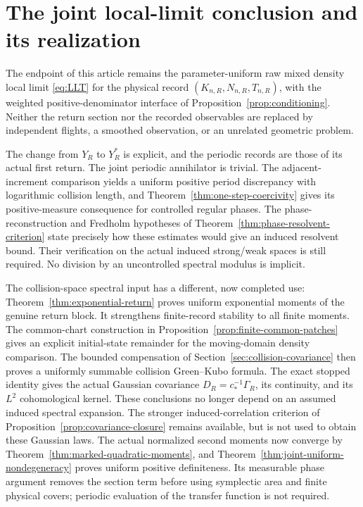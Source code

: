 \section{The joint local-limit conclusion and its realization}
\label{sec:final-realization}
The endpoint of this article remains the parameter-uniform raw mixed
density local limit \eqref{eq:LLT} for the physical record
$(K_{n,R},N_{n,R},T_{n,R})$, with the weighted positive-denominator
interface of Proposition~\ref{prop:conditioning}. Neither the return
section nor the recorded observables are replaced by independent flights,
a smoothed observation, or an unrelated geometric problem.

The change from $Y_R$ to $Y_R^*$ is explicit, and the periodic records
are those of its actual first return. The joint periodic annihilator is
trivial. The adjacent-increment comparison yields a uniform positive
period discrepancy with logarithmic collision length, and
Theorem~\ref{thm:one-step-coercivity} gives its positive-measure
consequence for controlled regular phases. The phase-reconstruction and
Fredholm hypotheses of Theorem~\ref{thm:phase-resolvent-criterion} state
precisely how these estimates would give an induced resolvent bound.
Their verification on the actual induced strong/weak spaces is still
required. No division by an uncontrolled spectral modulus is implicit.

The collision-space spectral input has a different, now completed use:
Theorem~\ref{thm:exponential-return} proves uniform exponential moments
of the genuine return block. It strengthens finite-record stability to
all finite moments. The common-chart construction in
Proposition~\ref{prop:finite-common-patches} gives an explicit
initial-state remainder for the moving-domain density comparison.
The bounded compensation of Section~\ref{sec:collision-covariance}
then proves a uniformly summable collision Green--Kubo formula. The
exact stopped identity gives the actual Gaussian covariance
$D_R=c_*^{-1}\Gamma_R$, its continuity, and its $L^2$ cohomological
kernel. These conclusions no longer depend on an assumed induced
spectral expansion. The stronger induced-correlation criterion of
Proposition~\ref{prop:covariance-closure} remains available, but is not
used to obtain these Gaussian laws. The actual normalized second
moments now converge by Theorem~\ref{thm:marked-quadratic-moments},
and Theorem~\ref{thm:joint-uniform-nondegeneracy} proves uniform positive
definiteness. Its measurable phase argument removes the section term
before using symplectic area and finite physical covers; periodic
evaluation of the transfer function is not required.

